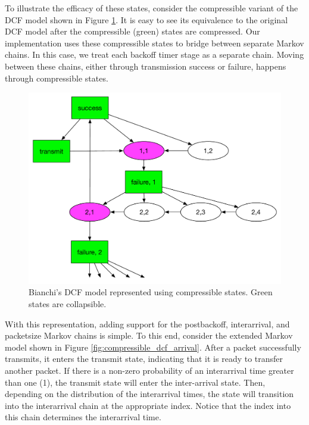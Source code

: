 \documentclass[conference]{IEEEtran}
\begin{document}
To illustrate the efficacy of these states, consider the compressible variant of the DCF model shown in Figure \ref{fig:compressible_dcf}. It is easy to see its equivalence to the original DCF model after the compressible (green) states are compressed. Our implementation uses these compressible states to bridge between separate Markov chains. In this case, we treat each backoff timer stage as a separate chain. Moving between these chains, either through transmission success or failure, happens through compressible states.

\begin{figure}
\begin{center}
\includegraphics[scale=0.35]{../../sketches/compressible_dcf.pdf}
\caption{Bianchi's DCF model represented using compressible states. Green states are collapsible.}
\label{fig:compressible_dcf}
\end{center}
\end{figure}

With this representation, adding support for the postbackoff, interarrival, and packetsize Markov chains is simple. To this end, consider the extended Markov model shown in Figure \ref{fig:compressible_dcf_arrival}. After a packet successfully transmits, it enters the {\sf transmit} state, indicating that it is ready to transfer another packet. If there is a non-zero probability of an interarrival time greater than one (1), the transmit state will enter the {\sf inter-arrival} state. Then, depending on the distribution of the interarrival times, the state will transition into the interarrival chain at the appropriate index. Notice that the index into this chain determines the interarrival time. 
\end{document}
